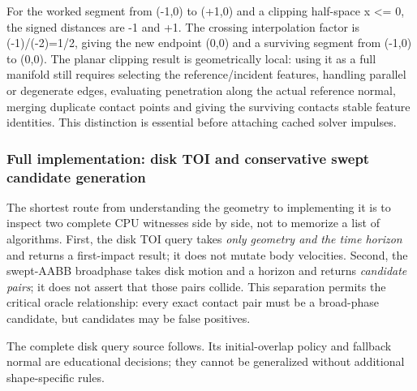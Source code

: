 For the worked segment from (-1,0) to (+1,0) and a clipping half-space x \textless= 0, the signed distances are -1 and +1. The crossing interpolation factor is (-1)/(-2)=1/2, giving the new endpoint (0,0) and a surviving segment from (-1,0) to (0,0). The planar clipping result is geometrically local: using it as a full manifold still requires selecting the reference/incident features, handling parallel or degenerate edges, evaluating penetration along the actual reference normal, merging duplicate contact points and giving the surviving contacts stable feature identities. This distinction is essential before attaching cached solver impulses.

\subsubsection{Full implementation: disk TOI and conservative swept candidate generation}\label{04-visual-computing-ii-ch026-full-implementation-disk-toi-and-conservative-swept-candidate-generation}

\hypertarget{04-visual-computing-ii-ch026-full-implementation-disk-toi-and-conservative-swept-candidate-generation}{}

The shortest route from understanding the geometry to implementing it is to inspect two complete CPU witnesses side by side, not to memorize a list of algorithms. First, the disk TOI query takes \emph{only geometry and the time horizon} and returns a first-impact result; it does not mutate body velocities. Second, the swept-AABB broadphase takes disk motion and a horizon and returns \emph{candidate pairs}; it does not assert that those pairs collide. This separation permits the critical oracle relationship: every exact contact pair must be a broad-phase candidate, but candidates may be false positives.

The complete disk query source follows. Its initial-overlap policy and fallback normal are educational decisions; they cannot be generalized without additional shape-specific rules.

